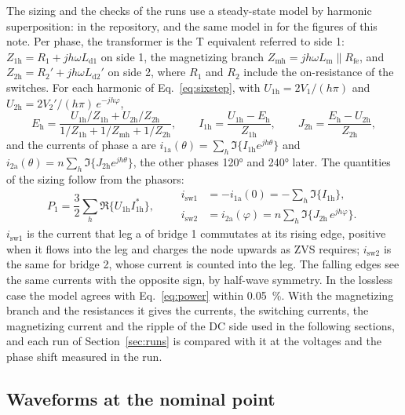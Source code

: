 \documentclass[12pt,a4paper]{scrartcl}
\newcommand{\ped}[1]{_{\mathrm{#1}}}
\begin{document}
\begin{onehalfspace}
The sizing and the checks of the runs use a steady-state model by harmonic superposition:  in the repository, and the same model in  for the figures of this note. Per phase, the transformer is the T equivalent referred to side 1: $Z\ped{1h} = R\ped{1} + jh\omega L\ped{d1}$ on side 1, the magnetizing branch $Z\ped{mh} = jh\omega L\ped{m} \parallel R\ped{fe}$, and $Z\ped{2h} = R\ped{2}' + jh\omega L\ped{d2}'$ on side 2, where $R\ped{1}$ and $R\ped{2}$ include the on-resistance of the switches. For each harmonic of Eq.~\eqref{eq:sixstep}, with $U\ped{1h} = 2V\ped{1}/(h\pi)$ and $U\ped{2h} = 2V\ped{2}'/(h\pi)\,e^{-jh\varphi}$,
\begin{equation}
	E\ped{h} = \frac{U\ped{1h}/Z\ped{1h} + U\ped{2h}/Z\ped{2h}}{1/Z\ped{1h} + 1/Z\ped{mh} + 1/Z\ped{2h}}, \qquad
	I\ped{1h} = \frac{U\ped{1h} - E\ped{h}}{Z\ped{1h}}, \qquad
	J\ped{2h} = \frac{E\ped{h} - U\ped{2h}}{Z\ped{2h}},
	\label{eq:harmonic}
\end{equation}
and the currents of phase a are $i\ped{1a}(\theta) = \sum_h \Im\{I\ped{1h} e^{jh\theta}\}$ and $i\ped{2a}(\theta) = n \sum_h \Im\{J\ped{2h} e^{jh\theta}\}$, the other phases \ang{120} and \ang{240} later. The quantities of the sizing follow from the phasors:
\begin{equation}
	P\ped{1} = \frac{3}{2}\sum_h \Re\{U\ped{1h} I\ped{1h}^*\}, \qquad
	\begin{aligned}
		i\ped{sw1} &= -i\ped{1a}(0) = -\sum_h \Im\{I\ped{1h}\},\\
		i\ped{sw2} &= i\ped{2a}(\varphi) = n\sum_h \Im\{J\ped{2h}\, e^{jh\varphi}\}.
	\end{aligned}
	\label{eq:isw}
\end{equation}
$i\ped{sw1}$ is the current that leg a of bridge 1 commutates at its rising edge, positive when it flows into the leg and charges the node upwards as ZVS requires; $i\ped{sw2}$ is the same for bridge 2, whose current is counted into the leg. The falling edges see the same currents with the opposite sign, by half-wave symmetry. In the lossless case the model agrees with Eq.~\eqref{eq:power} within \SI{0.05}{\percent}. With the magnetizing branch and the resistances it gives the currents, the switching currents, the magnetizing current and the ripple of the DC side used in the following sections, and each run of Section~\ref{sec:runs} is compared with it at the voltages and the phase shift measured in the run.

\subsection{Waveforms at the nominal point}
\label{sec:waveforms}


\end{onehalfspace}
\end{document}
